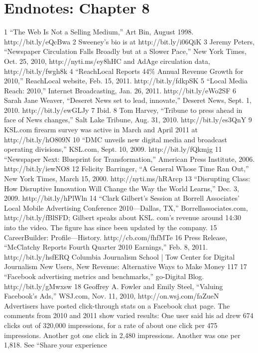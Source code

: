 \section{Endnotes: Chapter 8}
1 ``The Web Is Not a Selling Medium,'' Art Bin, August 1998. http://bit.ly/eQcBwa
2 Sweeney's bio is at http://bit.ly/i06QiK
3 Jeremy Peters, ``Newspaper Circulation Falls Broadly but at a Slower Pace,'' New York Times,
Oct. 25, 2010, http://nyti.ms/ey8hHC and AdAge circulation data, http://bit.ly/fwgh8k
4 ``ReachLocal Reports 44\% Annual Revenue Growth for 2010,'' ReachLocal website,
Feb. 15, 2011. http://bit.ly/fdkpSK
5 ``Local Media Reach: 2010,'' Internet Broadcasting, Jan. 26, 2011. http://bit.ly/eWo2SF
6 Sarah Jane Weaver, ``Deseret News set to lead, innovate,'' Deseret News, Sept. 1, 2010.
http://bit.ly/ewGLJy
7 Ibid.
8 Tom Harvey, ``Tribune to press ahead in face of News changes,'' Salt Lake Tribune,
Aug. 31, 2010. http://bit.ly/es3QnY
9 KSL.com firearm survey was active in March and April 2011 at http://bit.ly/hO809N
10 ``DMC unveils new digital media and broadcast operating divisions,'' KSL.com, Sept. 10, 2009.
http://bit.ly/fQkmjg
11 ``Newspaper Next: Blueprint for Transformation,'' American Press Institute, 2006.
http://bit.ly/iewNO8
12 Felicity Barringer, ``A General Whose Time Ran Out,'' New York Times, March 15, 2000.
http://nyti.ms/hRArcp
13 ``Disrupting Class: How Disruptive Innovation Will Change the Way the World Learns,''
Dec. 3, 2009. http://bit.ly/hPlWln
14 ``Clark Gilbert's Session at Borrell Associates' Local Mobile Advertising Conference
2010—Dallas, TX,'' Borrellassociates.com, http://bit.ly/fBlSFD; Gilbert speaks about KSL.
com's revenue around 14:30 into the video. The figure has since been updated by the company.
15 CareerBuilder: Profile—History. http://cb.com/fhfMTe
16 Press Release, ``McClatchy Reports Fourth Quarter 2010 Earnings,'' Feb. 8, 2011.
http://bit.ly/hsfERQ
Columbia Journalism School | Tow Center for Digital Journalism
New Users, New Revenue: Alternative Ways to Make Money 117
17 ``Facebook advertising metrics and benchmarks,'' go-Digital Blog. http://bit.ly/gMwxsw
18 Geoffrey A. Fowler and Emily Steel, ``Valuing Facebook's Ads,'' WSJ.com, Nov. 11, 2010,
http://on.wsj.com/faZueN Advertisers have posted click-through stats on a Facebook chat
page. The comments from 2010 and 2011 show varied results: One user said his ad drew 674
clicks out of 320,000 impressions, for a rate of about one click per 475 impressions. Another
got one click in 2,480 impressions. Another was one per 1,818. See ``Share your experience
